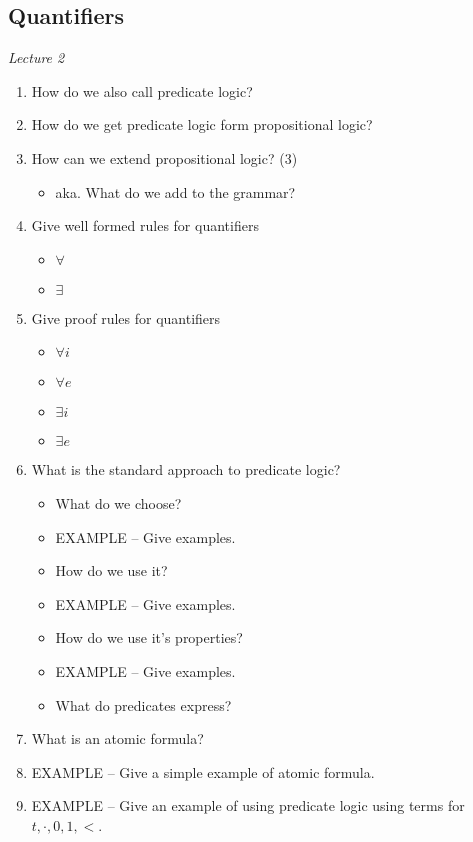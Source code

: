 \documentclass[fleqn]{article}
\begin{document}
\subsection{Quantifiers}
\textit{Lecture 2}
\begin{enumerate}
    \item How do we also call predicate logic?
    \item How do we get predicate logic form propositional logic?
    \item How can we extend propositional logic? (3)
    \begin{itemize}
        \item aka. What do we add to the grammar?
    \end{itemize}
    \item Give well formed rules for quantifiers
    \begin{itemize}
        \item $\forall$
        \item $\exists$
    \end{itemize}
    \item Give proof rules for quantifiers
    \begin{itemize}
        \item $\forall i$
        \item $\forall e$
        \item $\exists i$
        \item $\exists e$
    \end{itemize}
    \item What is the standard approach to predicate logic?
    \begin{itemize}
        \item What do we choose?
        \item EXAMPLE -- Give examples.
        \item How do we use it?
        \item EXAMPLE -- Give examples.
        \item How do we use it's properties?
        \item EXAMPLE -- Give examples.
        \item What do predicates express?
    \end{itemize}
    \item What is an atomic formula?
    \item EXAMPLE -- Give a simple example of atomic formula.
    \item EXAMPLE -- Give an example of using predicate logic using terms for $t, \cdot, 0, 1, <$.

\end{enumerate}
\end{document}
